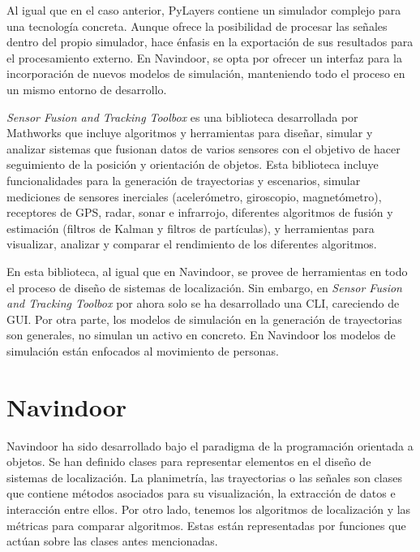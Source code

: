 Al igual que en el caso anterior, PyLayers contiene un simulador complejo para una tecnología concreta. Aunque ofrece la posibilidad de procesar las señales dentro del propio simulador, hace énfasis en la exportación de sus resultados para el procesamiento externo. En Navindoor, se opta por ofrecer un interfaz para la incorporación de nuevos modelos de simulación, manteniendo todo el proceso en un mismo entorno de desarrollo.

\emph{Sensor Fusion and Tracking Toolbox}  es una biblioteca desarrollada por Mathworks que incluye algoritmos y herramientas para diseñar, simular y analizar sistemas que fusionan datos de varios sensores con el objetivo de hacer seguimiento de la posición y orientación de objetos.
Esta biblioteca incluye funcionalidades para la generación de trayectorias y escenarios, simular mediciones de sensores inerciales (acelerómetro, giroscopio, magnetómetro), receptores de GPS, radar, sonar e infrarrojo, diferentes algoritmos de fusión y estimación (filtros de Kalman y filtros de partículas), y herramientas para visualizar, analizar y comparar el rendimiento de los diferentes algoritmos.

En esta biblioteca, al igual que en Navindoor, se provee de herramientas en todo el proceso de diseño de sistemas de localización. Sin embargo, en \emph{Sensor Fusion and Tracking Toolbox} por ahora solo se ha desarrollado una  CLI, careciendo de GUI. Por otra parte, los modelos de simulación en la generación de trayectorias son generales, no simulan un activo en concreto. En Navindoor los modelos de simulación están enfocados al movimiento de personas.

\section{Navindoor}
Navindoor ha sido desarrollado bajo el paradigma de la programación orientada a objetos. Se han definido clases para representar elementos en el diseño de sistemas de localización. La planimetría, las trayectorias o las señales son clases que contiene métodos asociados para su visualización, la extracción de datos e interacción entre ellos. Por otro lado, tenemos los algoritmos de localización y las métricas para comparar algoritmos. Estas están representadas por funciones que actúan sobre las clases antes mencionadas.

